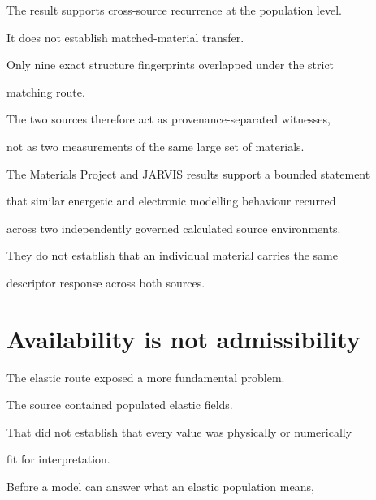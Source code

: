 \documentclass[11pt,a4paper,oneside]{report}
\begin{document}
The result supports cross-source recurrence at the population level.



It does not establish matched-material transfer.



Only nine exact structure fingerprints overlapped under the strict

matching route.



The two sources therefore act as provenance-separated witnesses,

not as two measurements of the same large set of materials.





\begin{claimboundary}



The Materials Project and JARVIS results support a bounded statement

that similar energetic and electronic modelling behaviour recurred

across two independently governed calculated source environments.



They do not establish that an individual material carries the same

descriptor response across both sources.



\end{claimboundary}





\section{Availability is not admissibility}



The elastic route exposed a more fundamental problem.



The source contained populated elastic fields.



That did not establish that every value was physically or numerically

fit for interpretation.



Before a model can answer what an elastic population means,
\end{document}

